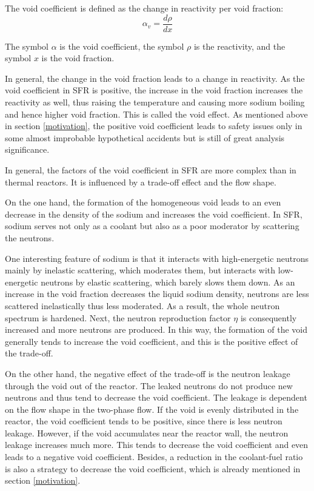 \documentclass[11pt]{article}
\begin{document}
The void coefficient is defined as the change in reactivity per void fraction:
\begin{equation*}
    \alpha_v = \frac{d\rho}{dx}
\end{equation*}

The symbol \(\alpha\) is the void coefficient, the symbol \(\rho\) is the reactivity, and the symbol \(x\) is the void fraction.

In general, the change in the void fraction leads to a change in reactivity. As the void coefficient in SFR is positive, the increase in the void fraction increases the reactivity as well, thus raising the temperature and causing more sodium boiling and hence higher void fraction. This is called the void effect. As mentioned above in section \ref{motivation}, the positive void coefficient leads to safety issues only in some almost improbable hypothetical accidents but is still of great analysis significance. 

In general, the factors of the void coefficient in SFR are more complex than in thermal reactors. It is influenced by a trade-off effect and the flow shape.

On the one hand, the formation of the homogeneous void leads to an even decrease in the density of the sodium and increases the void coefficient. In SFR, sodium serves not only as a coolant but also as a poor moderator by scattering the neutrons.

One interesting feature of sodium is that it interacts with high-energetic neutrons mainly by inelastic scattering, which moderates them, but interacts with low-energetic neutrons by elastic scattering, which barely slows them down. As an increase in the void fraction decreases the liquid sodium density, neutrons are less scattered inelastically thus less moderated. As a result, the whole neutron spectrum is hardened. Next, the neutron reproduction factor \(\eta\) is consequently increased and more neutrons are produced. In this way, the formation of the void generally tends to increase the void coefficient, and this is the positive effect of the trade-off. \cite{ lamarshIntroductionNuclearEngineering2001, tommasiValidationSodiumVoid2010}

On the other hand, the negative effect of the trade-off is the neutron leakage through the void out of the reactor. The leaked neutrons do not produce new neutrons and thus tend to decrease the void coefficient. The leakage is dependent on the flow shape in the two-phase flow. If the void is evenly distributed in the reactor, the void coefficient tends to be positive, since there is less neutron leakage. However, if the void accumulates near the reactor wall, the neutron leakage increases much more. This tends to decrease the void coefficient and even leads to a negative void coefficient. Besides, a reduction in the coolant-fuel ratio is also a strategy to decrease the void coefficient, which is already mentioned in section \ref{motivation}. \cite{lamarshIntroductionNuclearEngineering2001}
\end{document}
